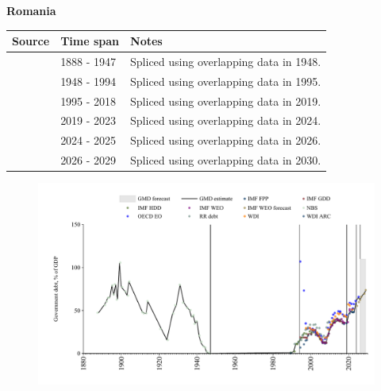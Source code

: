 \documentclass[12pt,a4paper,landscape]{article}
\begin{document}
\begin{adjustbox}{max totalsize={\paperwidth}{\paperheight},center}
\begin{minipage}[t][\textheight][t]{\textwidth}
\vspace*{0.5cm}
{}
\begin{center}
{\Large\bfseries Romania}
\end{center}
\vspace{0.5cm}
\begin{table}[H]
\centering
\small
\begin{tabular}{|l|l|l|}
\hline
\textbf{Source} & \textbf{Time span} & \textbf{Notes} \\
\hline
\rowcolor{white}\cite{NBS}& 1888 - 1947 &Spliced using overlapping data in 1948.\\
\rowcolor{lightgray}\cite{IMF_HDD}& 1948 - 1994 &Spliced using overlapping data in 1995.\\
\rowcolor{white}\cite{IMF_GDD}& 1995 - 2018 &Spliced using overlapping data in 2019.\\
\rowcolor{lightgray}\cite{IMF_FPP}& 2019 - 2023 &Spliced using overlapping data in 2024.\\
\rowcolor{white}\cite{OECD_EO}& 2024 - 2025 &Spliced using overlapping data in 2026.\\
\rowcolor{lightgray}\cite{IMF_WEO_forecast}& 2026 - 2029 &Spliced using overlapping data in 2030.\\
\hline
\end{tabular}
\end{table}
\begin{figure}[H]
\centering
\includegraphics[width=\textwidth,height=0.6\textheight,keepaspectratio]{graphs/ROU_govdebt_GDP.pdf}
\end{figure}
\end{minipage}
\end{adjustbox}
\end{document}
